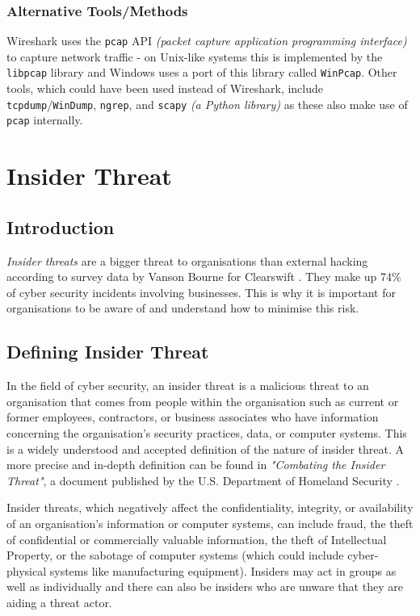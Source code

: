 \documentclass[12pt]{report}
\begin{document}
\subsection*{Alternative Tools/Methods}
Wireshark uses the \texttt{pcap} API \textit{(packet capture application programming interface)} to capture network traffic - on Unix-like systems this is implemented by the \texttt{libpcap} library and Windows uses a port of this library called \texttt{WinPcap}. Other tools, which could have been used instead of Wireshark, include \texttt{tcpdump}/\texttt{WinDump}, \texttt{ngrep}, and \texttt{scapy} \textit{(a Python library)} as these also make use of \texttt{pcap} internally.


\pagebreak
\chapter{Insider Threat}
\section{Introduction}
\textit{Insider threats} are a bigger threat to organisations than external hacking according to survey data by Vanson Bourne for Clearswift \citep{site:itpro:insiderthreats:20170922}. They make up 74\% of cyber security incidents involving businesses. This is why it is important for organisations to be aware of and understand how to minimise this risk.

\section{Defining Insider Threat}
In the field of cyber security, an insider threat is a malicious threat to an organisation that comes from people within the organisation such as current or former employees, contractors, or business associates who have information concerning the organisation's security practices, data, or computer systems. This is a widely understood and accepted definition of the nature of insider threat. A more precise and in-depth definition can be found in \textit{"Combating the Insider Threat"}, a document published by the U.S. Department of Homeland Security \cite{pdf:nccic:combating_insider_threat:20140502}.

Insider threats, which negatively affect the confidentiality, integrity, or availability of an organisation's information or computer systems, can include fraud, the theft of confidential or commercially valuable information, the theft of Intellectual Property, or the sabotage of computer systems (which could include cyber-physical systems like manufacturing equipment). Insiders may act in groups as well as individually and there can also be insiders who are unware that they are aiding a threat actor.
\end{document}
